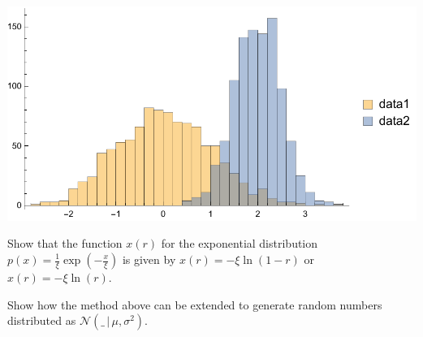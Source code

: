 \documentclass{tstextbook}
\begin{document}
 \includegraphics[scale=1, center]{images/normal_distributions_from_data.pdf}
   
\begin{exercise}
  Show that the function $x(r)$ for the exponential distribution 
  $p(x)=\frac{1}{\xi}\exp\left(-\frac{x}{\xi}\right)$ is given by $x(r)=-\xi\ln\left(1-r\right)$ or $x(r)=-\xi\ln\left(r\right)$.   
\end{exercise}

\begin{exercise}
  Show how the method above can be extended to generate random numbers distributed as $\mathcal{N}(\_\,\vert\,\mu,\sigma^2)$.   
\end{exercise}
\end{document}
